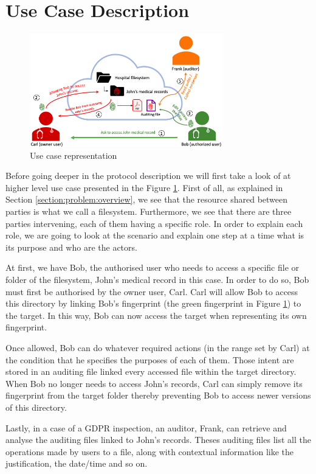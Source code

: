 \documentclass[../main.tex]{subfiles}
\begin{document}
\section{Use Case Description}
\label{section:problem:use_case}
\begin{figure}[h]
    \centering
    \includegraphics[width=0.75\textwidth]{../../images/problem/use_case}
    
    \label{figure:problem:use_case}
    \caption{Use case representation}
\end{figure}

\par Before going deeper in the protocol description we will first take a look of at higher level use case presented in the Figure \ref{figure:problem:use_case}. First of all, as explained in Section \ref{section:problem:overview}, we see that the resource shared between parties is what we call a filesystem. Furthermore, we see that there are three parties intervening, each of them having a specific role. In order to explain each role, we are going to look at the scenario and explain one step at a time what is its purpose and who are the actors.

\par At first, we have Bob, the authorised user who needs to access a specific file or folder of the filesystem, John's medical record in this case. In order to do so, Bob must first be authorised by the owner user, Carl. Carl will allow Bob to access this directory by linking Bob's fingerprint (the green fingerprint in Figure \ref{figure:problem:use_case}) to the target. In this way, Bob can now access the target when representing its own fingerprint.
\par Once allowed, Bob can do whatever required actions (in the range set by Carl) at the condition that he specifies the purposes of each of them. Those intent are stored in an auditing file linked every accessed file within the target directory. When Bob no longer needs to access John's records, Carl can simply remove its fingerprint from the target folder thereby preventing Bob to access newer versions of this directory.
\par Lastly, in a case of a GDPR inspection, an auditor, Frank, can retrieve and analyse the auditing files linked to John's records. Theses auditing files list all the operations made by users to a file, along with contextual information like the justification, the date/time and so on.
\end{document}
